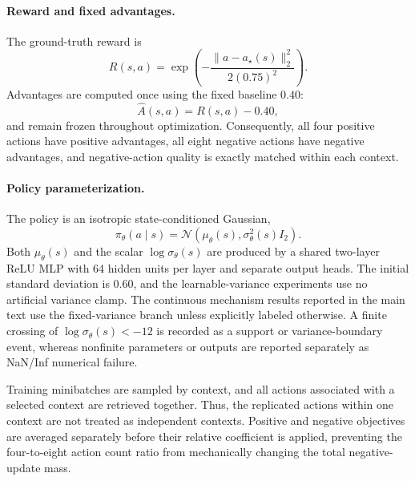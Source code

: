 \paragraph{Reward and fixed advantages.}
The ground-truth reward is
\begin{equation}
    R(s,a)
    =
    \exp
    \left(
        -
        \frac{
            \lVert a-a_\star(s)\rVert_2^2
        }{
            2(0.75)^2
        }
    \right).
    \label{eq:cu1_reward}
\end{equation}
Advantages are computed once using the fixed baseline $0.40$:
\begin{equation}
    \widehat A(s,a)
    =
    R(s,a)-0.40,
    \label{eq:cu1_advantage}
\end{equation}
and remain frozen throughout optimization. Consequently, all four
positive actions have positive advantages, all eight negative actions
have negative advantages, and negative-action quality is exactly matched
within each context.

\paragraph{Policy parameterization.}
The policy is an isotropic state-conditioned Gaussian,
\begin{equation}
    \pi_\theta(a\mid s)
    =
    \mathcal N
    \left(
        \mu_\theta(s),
        \sigma_\theta^2(s)I_2
    \right).
    \label{eq:cu1_policy}
\end{equation}
Both $\mu_\theta(s)$ and the scalar
$\log\sigma_\theta(s)$
are produced by a shared two-layer ReLU MLP with 64 hidden units per
layer and separate output heads. The initial standard deviation is
$0.60$, and the learnable-variance experiments use no artificial
variance clamp.  The continuous mechanism results reported in the main
text use the fixed-variance branch unless explicitly labeled otherwise. A finite crossing of
$\log\sigma_\theta(s)<-12$
is recorded as a support or variance-boundary event, whereas nonfinite
parameters or outputs are reported separately as NaN/Inf numerical
failure.

Training minibatches are sampled by context, and all actions associated
with a selected context are retrieved together. Thus, the replicated
actions within one context are not treated as independent contexts.
Positive and negative objectives are averaged separately before their
relative coefficient is applied, preventing the four-to-eight action
count ratio from mechanically changing the total negative-update mass.


